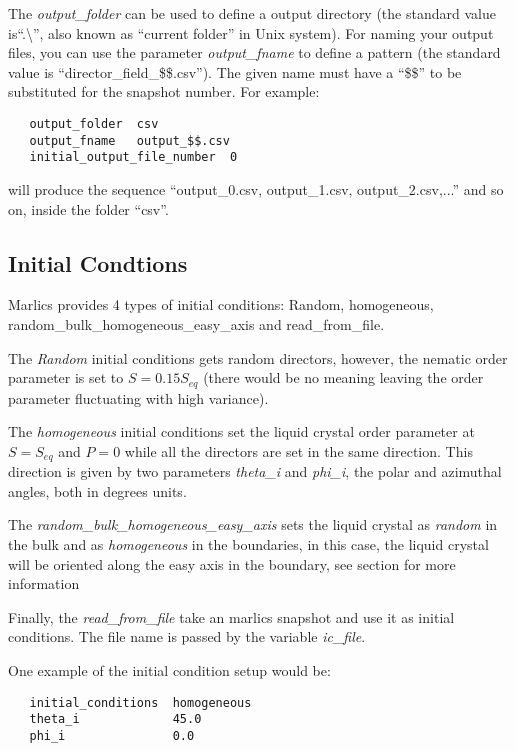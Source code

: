 \documentclass{article}
\begin{document}
The \textit{output\_folder} can be used to define a output directory
(the standard value is``.\textbackslash'', also known as ``current
folder'' in Unix system).  For naming your output files, you can use
the parameter \textit{output\_fname} to define a pattern (the standard
value is ``director\_field\_\$\$.csv'').  The given name must have a
``\$\$'' to be substituted for the snapshot number. For example:
\begin{lstlisting}
   output_folder  csv
   output_fname   output_$$.csv
   initial_output_file_number  0	
\end{lstlisting}
will produce the sequence ``output\_0.csv, output\_1.csv, output\_2.csv,...'' and so on, inside the folder ``csv''.  

\subsection{Initial Condtions}\label{ic.params}

Marlics provides 4 types of initial conditions: Random, homogeneous, random_bulk_homogeneous_easy_axis and read_from_file.

The \textit{Random} initial conditions gets random directors, however,
the nematic order parameter is set to $S=0.15 S_{eq}$ (there would be
no meaning leaving the order parameter fluctuating with high
variance).

The \textit{homogeneous} initial conditions set the liquid crystal
order parameter at $S=S_{eq}$ and $P=0$ while all the directors are
set in the same direction. This direction is given by two parameters
\textit{theta_i} and \textit{phi_i}, the polar and azimuthal angles,
both in degrees units.

The \textit{random_bulk_homogeneous_easy_axis} sets the liquid crystal
as \textit{random} in the bulk and as \textit{homogeneous} in the
boundaries, in this case, the liquid crystal will be oriented along
the easy axis in the boundary, see section \label{ssec:boundary} for
more information

Finally, the \textit{read_from_file} take an marlics snapshot and use
it as initial conditions. The file name is passed by the variable
\textit{ic_file}.

One example of the initial condition setup would be:
\begin{lstlisting}
   initial_conditions  homogeneous
   theta_i             45.0
   phi_i               0.0	
\end{lstlisting}
\end{document}
